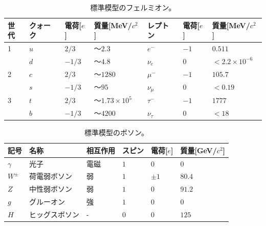 \begin{table}[tbp]
\begin{center}
\caption[標準模型のフェルミオン]{標準模型のフェルミオン。}
\label{SM_particle_fermion}
  \small
  \begin{tabular}{|l|lll|lll|} \hline
    世代 & クォーク & 電荷[$e$] & 質量[MeV/$c^2$]    & レプトン    & 電荷[$e$]   & 質量[MeV/$c^2$]      \\ \hline \hline
    1    & $u$      & $2/3$     & $〜2.3$            & $e^-$       & $-1$        & $0.511$              \\
         & $d$      & $-1/3$    & $〜4.8$            & $\nu_e$     & $0$         & $<2.2\times 10^{-6}$ \\ \hline
    2    & $c$      & $2/3$     & $〜1280$           & $\mu^-$     & $-1$        & $105.7$              \\
         & $s$      & $-1/3$    & $〜95$             & $\nu_\mu$   & $0$         & $<0.19$              \\ \hline
    3    & $t$      & $2/3$     & $〜1.73\times10^5$ & $\tau^-$    & $-1$        & $1777$               \\
         & $b$      & $-1/3$    & $〜4200$           & $\nu_\tau$  & $0$         & $<18$                \\ \hline
  \end{tabular}
\end{center}
\end{table}

\begin{table}[tbp]
\begin{center}
\caption[標準模型のボソン]{標準模型のボソン。}
\label{SM_particle_boson}
  \small
  \begin{tabular}{|llllll|} \hline
    記号      & 名称           & 相互作用 & スピン    & 電荷[$e$] & 質量[GeV/$c^2$] \\ \hline
    $\gamma$  & 光子           & 電磁     & $1$       & $0$       & $0$             \\
    $W^{\pm}$ & 荷電弱ボソン   & 弱       & $1$       & $\pm 1$   & $80.4$          \\
    $Z$       & 中性弱ボソン   & 弱       & $1$       & $0$       & $91.2$          \\
    $g$       & グルーオン     & 強       & $1$       & $0$       & $0$             \\ \hline
    $H$       & ヒッグスボソン & -        & $0$       & $0$       & $125$           \\ \hline
  \end{tabular}
\end{center}
\end{table}

